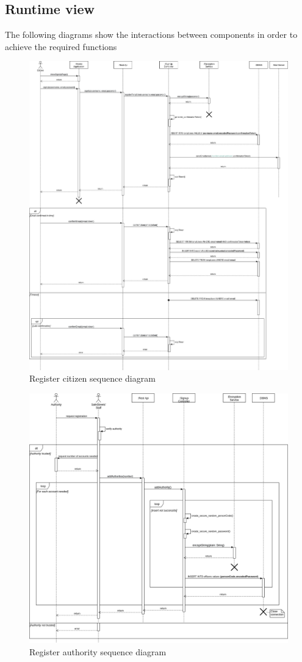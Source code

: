 \documentclass{article}
\begin{document}
	\subsection{Runtime view} The following diagrams show the interactions between components in order to achieve the
	required functions
	\begin{figure}[h]
		\includegraphics[width=\linewidth]{images/Register_citizen_sequence_diagram.png}
		\caption{Register citizen sequence diagram}
	\end{figure}
	\begin{figure}[h]
		\includegraphics[width=\linewidth]{images/Register_authority_sequence_diagram.png}
		\caption{Register authority sequence diagram}
	\end{figure}
\end{document}
